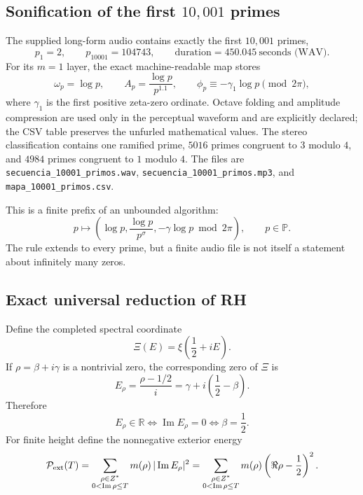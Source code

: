 \documentclass[11pt]{amsart}
\theoremstyle{definition}
\theoremstyle{remark}
\begin{document}
\subsection{Sonification of the first $10{,}001$ primes}
The supplied long-form audio contains exactly the first $10{,}001$ primes,
\begin{equation}\label{eq:sonificationRange}
 p_1=2,
 \qquad p_{10001}=104743,
 \qquad \text{duration}=450.045\ \text{seconds (WAV)}.
\end{equation}
For its $m=1$ layer, the exact machine-readable map stores
\begin{equation}\label{eq:sonificationExactMap}
 \omega_p=\log p,
 \qquad A_p=\frac{\log p}{p^{1.1}},
 \qquad \phi_p\equiv-\gamma_1\log p\pmod{2\pi},
\end{equation}
where $\gamma_1$ is the first positive zeta-zero ordinate.  Octave folding and amplitude
compression are used only in the perceptual waveform and are explicitly declared; the CSV
table preserves the unfurled mathematical values.  The stereo classification contains one
ramified prime, $5016$ primes congruent to $3$ modulo $4$, and $4984$ primes congruent to
$1$ modulo $4$.  The files are
\texttt{secuencia\_10001\_primos.wav},
\texttt{secuencia\_10001\_primos.mp3}, and
\texttt{mapa\_10001\_primos.csv}.

This is a finite prefix of an unbounded algorithm:
\begin{equation}\label{eq:unboundedSonificationAlgorithm}
 p\longmapsto
 \left(\log p,\frac{\log p}{p^\sigma},-\gamma\log p\bmod 2\pi\right),
 \qquad p\in\mathbb P.
\end{equation}
The rule extends to every prime, but a finite audio file is not itself a statement about
infinitely many zeros.

\subsection{Exact universal reduction of RH}
Define the completed spectral coordinate
\begin{equation}\label{eq:completedSpectralCoordinate}
 \Xi(E)=\xi\!\left(\frac12+iE\right).
\end{equation}
If $\rho=\beta+i\gamma$ is a nontrivial zero, the corresponding zero of $\Xi$ is
\begin{equation}\label{eq:zeroEnergyMap}
 E_\rho=\frac{\rho-1/2}{i}
 =\gamma+i\left(\frac12-\beta\right).
\end{equation}
Therefore
\begin{equation}\label{eq:energyRealityCriticalLine}
 E_\rho\in\mathbb R
 \iff \operatorname{Im}E_\rho=0
 \iff \beta=\frac12.
\end{equation}
For finite height define the nonnegative exterior energy
\begin{equation}\label{eq:exteriorEnergy}
 \mathcal P_{\rm ext}(T)
 =\sum_{\substack{\rho\in Z^*\\0<\operatorname{Im}\rho\le T}}
 m(\rho)\,|\operatorname{Im}E_\rho|^2
 =\sum_{\substack{\rho\in Z^*\\0<\operatorname{Im}\rho\le T}}
 m(\rho)\left(\Re\rho-\frac12\right)^2.
\end{equation}
\end{document}
